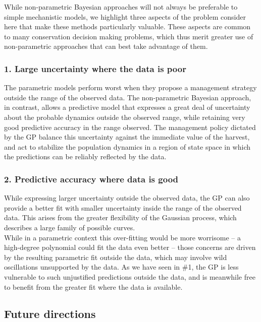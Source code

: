 \documentclass[author-year, review]{elsarticle} %
\begin{document}
While non-parametric Bayesian approaches will not always be preferable
to simple mechanistic models, we highlight three aspects of the problem
consider here that make these methods particularly valuable. These
aspects are common to many conservation decision making problems, which
thus merit greater use of non-parametric approaches that can best take
advantage of them.

\subsubsection{1. Large uncertainty where the data is poor}

The parametric models perform worst when they propose a management
strategy outside the range of the observed data. The non-parametric
Bayesian approach, in contrast, allows a predictive model that expresses
a great deal of uncertainty about the probable dynamics outside the
observed range, while retaining very good predictive accuracy in the
range observed. The management policy dictated by the GP balance this
uncertainty against the immediate value of the harvest, and act to
stabilize the population dynamics in a region of state space in which
the predictions can be reliably reflected by the data.

\subsubsection{2. Predictive accuracy where data is good}

While expressing larger uncertainty outside the observed data, the GP
can also provide a better fit with smaller uncertainty inside the range
of the observed data. This arises from the greater flexibility of the
Gaussian process, which describes a large family of possible
curves.\\While in a parametric context this over-fitting would be more
worrisome -- a high-degree polynomial could fit the data even better --
those concerns are driven by the resulting parametric fit outside the
data, which may involve wild oscillations unsupported by the data. As we
have seen in \#1, the GP is less vulnerable to such unjustified
predictions outside the data, and is meanwhile free to benefit from the
greater fit where the data is available.

\subsection{Future directions}
\end{document}

